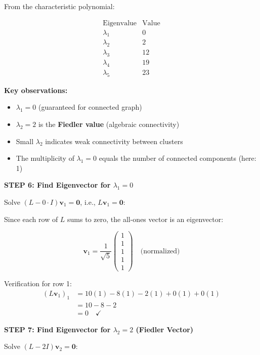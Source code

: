 \documentclass[12pt]{article}
\begin{document}
\begin{solution}
From the characteristic polynomial:

\[
\boxed{\begin{array}{c|c}
\text{Eigenvalue} & \text{Value} \\
\hline
\lambda_1 & 0 \\
\lambda_2 & 2 \\
\lambda_3 & 12 \\
\lambda_4 & 19 \\
\lambda_5 & 23
\end{array}}
\]

\textbf{Key observations:}
\begin{itemize}
    \item $\lambda_1 = 0$ (guaranteed for connected graph)
    \item $\lambda_2 = 2$ is the \textbf{Fiedler value} (algebraic connectivity)
    \item Small $\lambda_2$ indicates weak connectivity between clusters
    \item The multiplicity of $\lambda_1 = 0$ equals the number of connected components (here: 1)
\end{itemize}

\textbf{STEP 6: Find Eigenvector for $\lambda_1 = 0$}

Solve $(L - 0 \cdot I)\mathbf{v}_1 = \mathbf{0}$, i.e., $L\mathbf{v}_1 = \mathbf{0}$:

Since each row of $L$ sums to zero, the all-ones vector is an eigenvector:

\[
\mathbf{v}_1 = \frac{1}{\sqrt{5}}\begin{pmatrix} 1 \\ 1 \\ 1 \\ 1 \\ 1 \end{pmatrix} \quad \text{(normalized)}
\]

Verification for row 1:
\begin{align*}
(L\mathbf{v}_1)_1 &= 10(1) - 8(1) - 2(1) + 0(1) + 0(1) \\
&= 10 - 8 - 2 \\
&= 0 \quad \checkmark
\end{align*}

\textbf{STEP 7: Find Eigenvector for $\lambda_2 = 2$ (Fiedler Vector)}

Solve $(L - 2I)\mathbf{v}_2 = \mathbf{0}$:


\end{solution}
\end{document}
